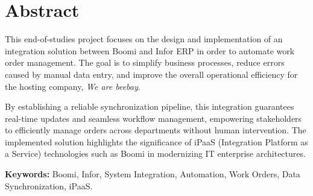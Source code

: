 \chapter*{Abstract}

This end-of-studies project focuses on the design and implementation of an integration solution between Boomi and Infor ERP in order to automate work order management. The goal is to simplify business processes, reduce errors caused by manual data entry, and improve the overall operational efficiency for the hosting company, \textit{We are beebay}. 

By establishing a reliable synchronization pipeline, this integration guarantees real-time updates and seamless workflow management, empowering stakeholders to efficiently manage orders across departments without human intervention. The implemented solution highlights the significance of iPaaS (Integration Platform as a Service) technologies such as Boomi in modernizing IT enterprise architectures.

\vspace{1.5cm}

\textbf{Keywords:} Boomi, Infor, System Integration, Automation, Work Orders, Data Synchronization, iPaaS.